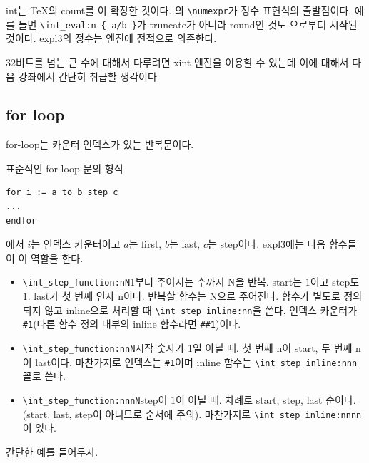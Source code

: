 \documentclass[a4paper,amsmath]{oblivoir}
\newcounter{sub}
\newcommand\bangotsuite{\stepcounter{sub}\thesub}
\begin{document}
\medskip

\hangfrom{붙임 \bangotsuite: }int는 \TeX 의 count를 이 확장한 것이다. 의 \verb|\numexpr|가 정수 표현식의 출발점이다. 예를 들면 \verb|\int_eval:n { a/b }|가 truncate가 아니라 round인 것도 으로부터 시작된 것이다. expl3의 정수는  엔진에 전적으로 의존한다.

\hangfrom{붙임 \bangotsuite: }32비트를 넘는 큰 수에 대해서 다루려면 \textsf{xint} 엔진을 이용할 수 있는데 이에 대해서
다음 강좌에서 간단히 취급할 생각이다.

\subsection{for loop}

for-loop는 카운터 인덱스가 있는 반복문이다.

표준적인 for-loop 문의 형식
\begin{verbatim}
for i := a to b step c
...
endfor
\end{verbatim}
에서 $i$는 인덱스 카운터이고 $a$는 first, $b$는 last, $c$는 step이다. expl3에는 다음 함수들이 이 역할을 한다.
\begin{itemize} \firmlist
\item \verb|\int_step_function:nN|\quad 1부터 주어지는 수까지 N을 반복. start는 $1$이고 step도 $1$. last가 첫 번째 인자 n이다. 반복할 함수는 N으로 주어진다. 함수가 별도로 정의되지 않고 inline으로 처리할 때 \verb|\int_step_inline:nn|을 쓴다. 인덱스 카운터가 \verb|#1|(다른 함수 정의 내부의 inline 함수라면 \verb|##1|)이다.
\item \verb|\int_step_function:nnN|\quad 시작 숫자가 1일 아닐 때. 첫 번째 n이 start, 두 번째 n이 last이다. 마찬가지로 인덱스는 \verb|#1|이며 inline 함수는 \verb|\int_step_inline:nnn| 꼴로 쓴다.
\item \verb|\int_step_function:nnnN|\quad step이 $1$이 아닐 때. 차례로 start, step, last 순이다. (start, last, step이 아니므로 순서에 주의). 마찬가지로 \verb|\int_step_inline:nnnn|이 있다.
\end{itemize}

간단한 예를 들어두자.
\end{document}
